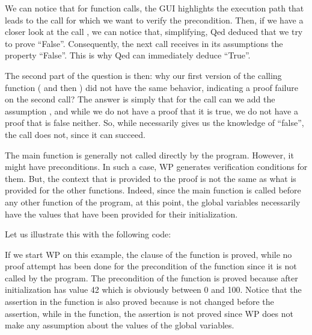 



We can notice that for function calls, the GUI highlights the execution
path that leads to the call for which we want to verify the precondition.
Then, if we have a closer look at the call , we
can notice that, simplifying, Qed deduced that we try to prove
``False''. Consequently, the next call  receives in its
assumptions the property ``False''. This is why Qed can immediately
deduce ``True''.



The second part of the question is then: why our first version of the
calling function ( and then ) did
not have the same behavior, indicating a proof failure on the second
call? The answer is simply that for the call  can we add
the assumption , and while we do not have a proof
that it is true, we do not have a proof that is false neither. So, while
 necessarily gives us the knowledge of ``false'',
the call  does not, since it can succeed.




The main function is generally not called directly by the program. However,
it might have preconditions. In such a case, WP generates verification
conditions for them. But, the context that is provided to the proof is not
the same as what is provided for the other functions. Indeed, since the main
function is called before any other function of the program, at this point, the
global variables necessarily have the values that have been provided for their
initialization.

Let us illustrate this with the following code:




If we start WP on this example, the  clause of the
 function is proved, while no proof attempt has been done for
the precondition of the  function since it is not called by the
program. The precondition of the  function is proved because
after initialization  has value 42 which is obviously between
0 and 100. Notice that the assertion in the  function is also
proved because  is not changed before the assertion, while in the
 function, the assertion is not proved since WP does not make any
assumption about the values of the global variables.


